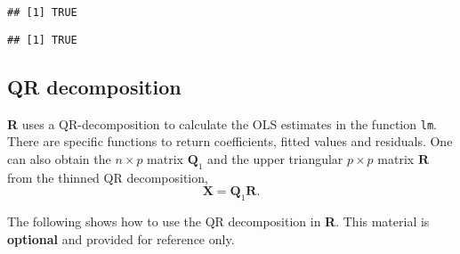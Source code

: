 \documentclass[]{book}
\newenvironment{Shaded}{\begin{snugshade}}{\end{snugshade}}
\newcommand{\CommentTok}[1]{\textcolor[rgb]{0.56,0.35,0.01}{\textit{#1}}}
\newcommand{\DataTypeTok}[1]{\textcolor[rgb]{0.13,0.29,0.53}{#1}}
\newcommand{\DecValTok}[1]{\textcolor[rgb]{0.00,0.00,0.81}{#1}}
\newcommand{\KeywordTok}[1]{\textcolor[rgb]{0.13,0.29,0.53}{\textbf{#1}}}
\newcommand{\NormalTok}[1]{#1}
\newcommand{\OperatorTok}[1]{\textcolor[rgb]{0.81,0.36,0.00}{\textbf{#1}}}
\newcommand{\OtherTok}[1]{\textcolor[rgb]{0.56,0.35,0.01}{#1}}
\newcommand{\StringTok}[1]{\textcolor[rgb]{0.31,0.60,0.02}{#1}}
\theoremstyle{definition}
\theoremstyle{definition}
\theoremstyle{definition}
\theoremstyle{remark}
\begin{document}
\begin{verbatim}
## [1] TRUE
\end{verbatim}

\begin{Shaded}
\end{Shaded}

\begin{verbatim}
## [1] TRUE
\end{verbatim}

\hypertarget{qr-decomposition}{%
\subsection{QR decomposition}\label{qr-decomposition}}

\textbf{R} uses a QR-decomposition to calculate the OLS estimates in the
function \texttt{lm}. There are specific functions to return
coefficients, fitted values and residuals. One can also obtain the
\(n \times p\) matrix \(\mathbf{Q}_1\) and the upper triangular
\(p \times p\) matrix \(\mathbf{R}\) from the thinned QR decomposition,
\[\mathbf{X} = \mathbf{Q}_1\mathbf{R}.\]

The following shows how to use the QR decomposition in \textbf{R}. This
material is \textbf{optional} and provided for reference only.

\begin{Shaded}
\end{Shaded}
\end{document}
